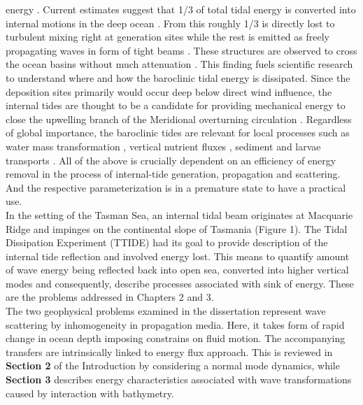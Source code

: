 \documentclass[12pt]{article}
\begin{document}
energy \citep{munk1997once}. Current estimates suggest that 1/3 of total tidal energy is 
converted into internal motions in the deep ocean \citep{egbert2000significant}. From this roughly 
1/3 is directly lost to turbulent mixing right at generation sites \citep{st2002role} while the 
rest is emitted as freely propagating waves in form of tight beams \citep{simmons2004tidally}. 
These structures are observed to cross the ocean basins without much attenuation 
\citep{zhao2016global}. This finding fuels scientific research to understand where and how the 
baroclinic tidal energy is dissipated. Since the deposition sites primarily would occur deep below 
direct wind influence, the internal tides are thought to be a candidate for providing mechanical 
energy to close the upwelling branch of the Meridional overturning circulation 
\citep{munk1998abyssal}. Regardless of global importance, the baroclinic tides are relevant for 
local processes such as water mass transformation \citep{stigebrandt1989vertical}, vertical 
nutrient fluxes \citep{sharples2007spring}, sediment \citep{hotchkiss1982internal} and larvae 
transports \citep{pineda1999circulation}. All of the above is crucially dependent on an efficiency 
of energy removal in the process of internal-tide generation, propagation and scattering. 
And the respective parameterization is in a premature state to have a practical use.\\
In the setting of the Tasman Sea, an internal tidal beam originates at Macquarie Ridge and impinges 
on the continental slope of Tasmania (Figure 1). The Tidal Dissipation Experiment (TTIDE) had its 
goal to provide description of the internal tide reflection and involved energy lost. This means to 
quantify amount of wave energy being reflected back into open sea, converted into higher vertical 
modes and consequently, describe processes associated with sink of energy. These are the problems 
addressed in Chapters 2 and 3.\\
The two geophysical problems examined in the dissertation represent wave scattering by 
inhomogeneity in propagation media. Here, it takes form of rapid change in ocean depth imposing 
constrains on fluid motion. The accompanying transfers are intrinsically linked to energy flux 
approach. This is reviewed in \textbf{Section 2} of the Introduction by considering a normal mode 
dynamics, while \textbf{Section 3} describes energy characteristics associated with wave 
transformations caused by interaction with bathymetry.\\
\end{document}
